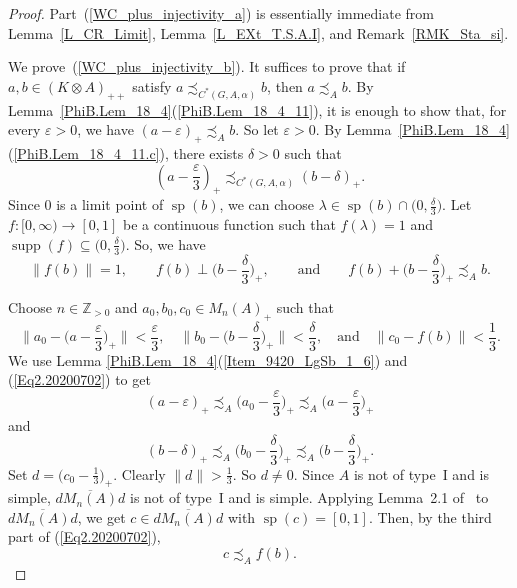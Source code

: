 \documentclass[10pt]{amsart}
\numberwithin{equation}{section}
\theoremstyle{definition}
\newcommand{\af}{\alpha}
\newcommand{\dt}{\delta}
\newcommand{\ep}{\varepsilon}
\newcommand{\ld}{\lambda}
\newcommand{\N}{{\mathbb{Z}}_{> 0}}
\newcommand{\spec}{{\operatorname{sp}}}
\newcommand{\supp}{{\operatorname{supp}}}
\newcommand{\andeqn}{\qquad {\mbox{and}} \qquad}
\newcommand{\CGAa}{C^* (G, A, \af)}
\newcommand{\cfn}{continuous function}
\newcommand{\I}{\infty}
\begin{document}
\begin{proof}
Part~(\ref{WC_plus_injectivity_a}) is essentially immediate from
Lemma~\ref{L_CR_Limit}, Lemma~\ref{L_EXt_T.S.A.I}, and Remark~\ref{RMK_Sta_si}.

We prove~(\ref{WC_plus_injectivity_b}).
It suffices to prove
that if $a, b \in ( K \otimes A)_{++}$
satisfy $a \precsim_{\CGAa} b$,
then $a \precsim_{A} b$.
By Lemma~\ref{PhiB.Lem_18_4}(\ref{PhiB.Lem_18_4_11}), it is enough to show that, for every $\ep>0$, we have
$(a - \ep)_{+} \precsim_{A} b$.
So let $\ep > 0$.
By Lemma~\ref{PhiB.Lem_18_4}(\ref{PhiB.Lem_18_4_11.c}), there exists  $\dt > 0$ such that
%
\begin{equation}\label{Eq1_2019_04_14_wTRP}
\left( a - \frac{\ep}{3} \right)_{+} \precsim_{\CGAa} (b - \dt)_{+}.
\end{equation}
%
Since $0$ is a limit point of $\spec(b)$, we can choose 
 $\ld \in \spec (b) \cap \big( 0, \frac{\dt}{3} \big)$.
Let $f \colon [0, \I) \to [0, 1]$
be a \cfn{}
such that $f (\ld) = 1$
and $\supp (f) \subseteq \big( 0, \frac{\dt}{3} \big)$.
So, we have
%
\begin{equation}\label{Eq_9421_Prop_hb}
\| f (b) \| = 1,
\qquad
f (b) \perp \Big( b - \frac{\dt}{3} \Big)_{+},
\andeqn
f (b) + \Big( b - \frac{\dt}{3} \Big)_{+} \precsim_{A} b.
\end{equation}
%

Choose $n \in \N$ and $a_0, b_0, c_0 \in M_n (A)_{+}$
such that
\begin{equation}
\label{Eq2.20200702}
\bigg\| a_0 - \Big( a - \frac{\ep}{3} \Big)_{+} \bigg\|
   < \frac{\ep}{3},
\quad
\bigg\| b_0 - \Big( b - \frac{\dt}{3} \Big)_{+} \bigg\|
   < \frac{\dt}{3},
\quad
\mbox{and}
\quad
\| c_0 - f (b) \| < \frac{1}{3}.
\end{equation}
We use Lemma \ref{PhiB.Lem_18_4}(\ref{Item_9420_LgSb_1_6}) and (\ref{Eq2.20200702}) to get
%
\begin{equation}\label{Eq_9417_FromIneq_wTRP}
(a - \ep)_{+}
 \precsim_{A} \Big( a_0 - \frac{\ep}{3} \Big)_{+}
 \precsim_{A} \Big( a - \frac{\ep}{3} \Big)_{+}
\end{equation}
%
and
%
\begin{equation}\label{Eq_9417_FromIneq_2_wTRP}
(b - \dt)_{+}
 \precsim_{A} \Big( b_0 - \frac{\dt}{3} \Big)_{+}
 \precsim_{A} \Big( b - \frac{\dt}{3} \Big)_{+}.
\end{equation}
%
Set $d = \big( c_0 - \frac{1}{3} \big)_{+}$.
Clearly $\| d \| > \frac{1}{3}$. So $d \neq 0$.
Since $A$ is not of type~I and is simple,
$\overline{d M_n (A) d}$ is not of type~I and is simple.
Applying Lemma~2.1 of~\cite{Ph14} to $\overline{d M_n(A) d}$, we get $c \in \overline{d M_n(A) d}$ with $\spec (c)= [0, 1]$. 
Then, by the third part of (\ref{Eq2.20200702}),
%
\begin{equation}\label{Eq_9606_chb}
c \precsim_{A} f (b).
\end{equation}
%


\end{proof}
\end{document}
